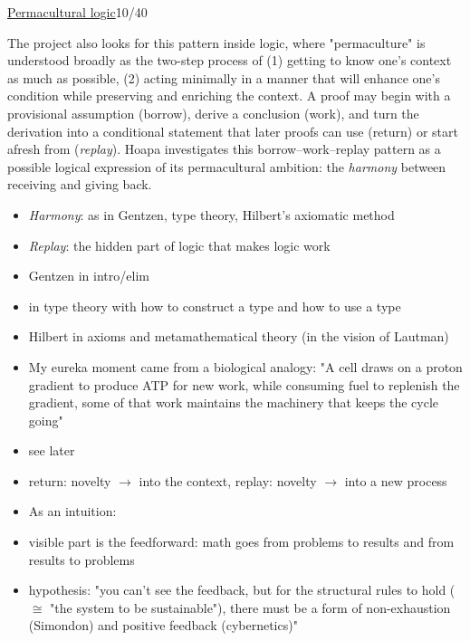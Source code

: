 \documentclass[a4paper,10pt]{article}
\newcommand{\slidehead}[2]{\par\addvspace{7pt}\noindent\underline{#1}\hfill{\color{gray}#2}\par\nopagebreak\vspace{1pt}}
\newcommand{\marked}[1]{\par\addvspace{2pt}{\bfseries #1}\par\nopagebreak}
\renewenvironment{leftbar}{%
  \def\FrameCommand{{\color{black!30}\vrule width 1.2pt}\hspace{6pt}}%
  \MakeFramed{\advance\hsize-\width \FrameRestore}}{\endMakeFramed}
\newenvironment{commentary}{\par\vspace{-2pt}\begin{leftbar}\color{black!80}}{\end{leftbar}}
\begin{document}
\slidehead{Permacultural logic}{10/40}
The project also looks for this pattern inside logic, where "permaculture" is understood broadly as the two-step process of (1) getting to know one's context as much as possible, (2) acting minimally in a manner that will enhance one's condition while preserving and enriching the context. A proof may begin with a provisional assumption (borrow), derive a conclusion (work), and turn the derivation into a conditional statement that later proofs can use (return) or start afresh from (\textcolor{replayolive}{\emph{replay}}). Hoapa investigates this borrow–work–replay pattern as a possible logical expression of its permacultural ambition: the \textcolor{harmonyorchid}{\emph{harmony}} between receiving and giving back.\par
\begin{itemize}
\item \textcolor{harmonyorchid}{\emph{Harmony}}: as in Gentzen, type theory, Hilbert's axiomatic method
\item \textcolor{replayolive}{\emph{Replay}}: the hidden part of logic that makes logic work
\end{itemize}
\begin{commentary}
\marked{\textcolor{harmonyorchid}{Harmony}}
\begin{itemize}
\item Gentzen in intro/elim
\item in type theory with how to construct a type and how to use a type
\item Hilbert in axioms and metamathematical theory (in the vision of Lautman)
\end{itemize}\vspace{2pt}
\begin{itemize}
\item My eureka moment came from a biological analogy: "A cell draws on a proton gradient to produce ATP for new work, while consuming fuel to replenish the gradient, some of that work maintains the machinery that keeps the cycle going"
\item see later
\end{itemize}
\marked{\textcolor{replayolive}{Replay}}
\begin{itemize}
\item return: novelty \ensuremath{\to} into the context, replay: novelty \ensuremath{\to} into a new process
\end{itemize}\vspace{2pt}
\begin{itemize}
\item As an intuition:
\item visible part is the feedforward: math goes from problems to results and from results to problems
\item hypothesis: "you can't see the feedback, but for the structural rules to hold (\ensuremath{\cong} "the system to be sustainable"), there must be a form of non-exhaustion (Simondon) and positive feedback (cybernetics)"
\end{itemize}
\end{commentary}
\end{document}
